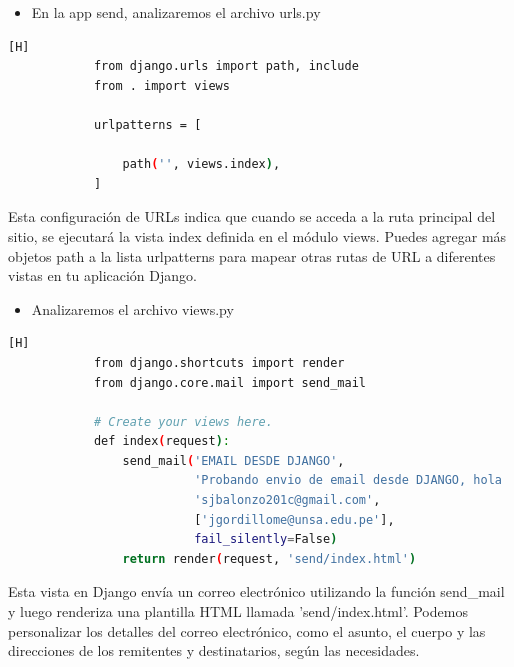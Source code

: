\documentclass{article}
\begin{document}
        
         \begin{itemize}
            \item En la app send, analizaremos el archivo urls.py
        \end{itemize}
        \begin{lstlisting}[language=bash,caption={Archivo send/urls.py}][H]
            from django.urls import path, include
            from . import views
            
            urlpatterns = [
            
                path('', views.index),
            ]
	\end{lstlisting}
        Esta configuración de URLs indica que cuando se acceda a la ruta principal del sitio, se ejecutará la vista index definida en el módulo views. Puedes agregar más objetos path a la lista urlpatterns para mapear otras rutas de URL a diferentes vistas en tu aplicación Django.\newline

        \begin{itemize}
            \item Analizaremos el archivo views.py
        \end{itemize}
        \begin{lstlisting}[language=bash,caption={Archivo send/views.py}][H]
            from django.shortcuts import render
            from django.core.mail import send_mail
            
            # Create your views here.
            def index(request):
                send_mail('EMAIL DESDE DJANGO',
                          'Probando envio de email desde DJANGO, hola :D',
                          'sjbalonzo201c@gmail.com',
                          ['jgordillome@unsa.edu.pe'],
                          fail_silently=False)
                return render(request, 'send/index.html')

	\end{lstlisting}
         Esta vista en Django envía un correo electrónico utilizando la función send\_mail y luego renderiza una plantilla HTML llamada 'send/index.html'. Podemos personalizar los detalles del correo electrónico, como el asunto, el cuerpo y las direcciones de los remitentes y destinatarios, según las necesidades.\newline
\end{document}
